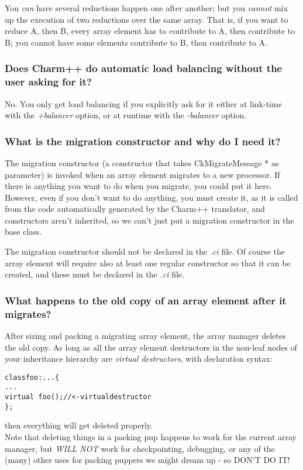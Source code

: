 You {\em can} have several reductions happen one after another; but
you {\em cannot} mix up the execution of two reductions over the same
array. That is, if you want to reduce A, then B, every array element has
to contribute to A, then contribute to B; you cannot have some elements
contribute to B, then contribute to A.

\subsubsection{Does Charm++ do automatic load balancing without the user asking
for it?}

No. You only get load balancing if you explicitly ask for it either at link-time
with the {\em +balancer} option, or at runtime with the {\em -balancer} option.

\subsubsection{What is the migration constructor and why do I need it?}

The migration constructor (a constructor that takes \textrm{CkMigrateMessage *}
as parameter) is invoked when an array element migrates to a new
processor. If there is anything you want to do when you migrate, you could put
it here. However, even if you don't want to do anything, you must create it, as
it is called from the code automatically generated by the Charm++ translator,
and constructors aren't inherited, so we can't just put a migration constructor
in the base class.

The migration constructor should not be declared in the {\em .ci} file. Of
course the array element will require also at least one regular constructor so
that it can be created, and these must be declared in the {\em .ci} file.

\subsubsection{What happens to the old copy of an array element after it migrates?}

After sizing and packing a migrating array element, the array manager
\textrm{delete}s
the old copy. As long as all the array element destructors in the non-leaf
nodes of your inheritance hierarchy are {\em virtual destructors}, with
declaration syntax:
\begin{alltt}
class foo : ... \{
  ...
  virtual ~foo(); // <- virtual destructor
\};
\end{alltt}
then everything will get deleted properly.\\
Note that deleting things in a packing pup happens to work for the
current array manager, but {\em WILL NOT} work for checkpointing, debugging,
or any of the (many) other uses for packing puppers we might dream up -
so DON'T DO IT!

